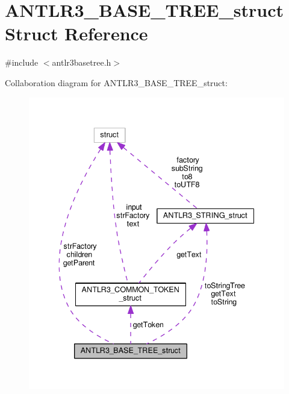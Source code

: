 \hypertarget{struct_a_n_t_l_r3___b_a_s_e___t_r_e_e__struct}{\section{A\-N\-T\-L\-R3\-\_\-\-B\-A\-S\-E\-\_\-\-T\-R\-E\-E\-\_\-struct Struct Reference}
\label{struct_a_n_t_l_r3___b_a_s_e___t_r_e_e__struct}
}


{\ttfamily \#include $<$antlr3basetree.\-h$>$}



Collaboration diagram for A\-N\-T\-L\-R3\-\_\-\-B\-A\-S\-E\-\_\-\-T\-R\-E\-E\-\_\-struct\-:
\nopagebreak
\begin{figure}[H]
\begin{center}
\leavevmode
\includegraphics[width=338pt]{struct_a_n_t_l_r3___b_a_s_e___t_r_e_e__struct__coll__graph}
\end{center}
\end{figure}
